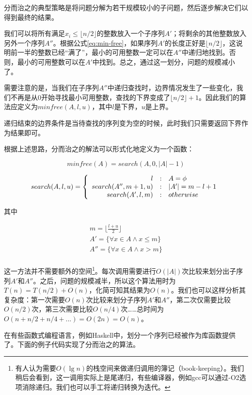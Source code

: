 \documentclass[UTF8]{article}
\begin{document}
分而治之的典型策略是将问题分解为若干规模较小的子问题，然后逐步解决它们以得到最终的结果。

我们可以将所有满足$x_i \leq \lfloor n/2 \rfloor$的整数放入一个子序列$A'$；将剩余的其他整数放入另外一个序列$A''$。根据公式\ref{eq:min-free}，如果序列$A'$的长度正好是$\lfloor n/2 \rfloor$，这说明前一半的整数已经“满了”，最小的可用整数一定可以在$A''$中递归地找到。否则，最小的可用整数可以在$A'$中找到。总之，通过这一划分，问题的规模减小了。

需要注意的是，当我们在子序列$A''$中递归查找时，边界情况发生了一些变化，我们不再是从0开始寻找最小可用整数，查找的下界变成了$\lfloor n/2 \rfloor + 1$。因此我们的算法应定义为$minfree(A, l, u)$，其中$l$是下界，$u$是上界。

递归结束的边界条件是当待查找的序列变为空的时候，此时我们只需要返回下界作为结果即可。

根据上述思路，分而治之的解法可以形式化地定义为一个函数：

\[
minfree(A) = search(A, 0, |A|-1)
\]

\[
search(A, l, u) = \left \{
       \begin{array}
       {r@{\quad:\quad}l}
       l & A = \phi \\
       search(A'', m+1, u) &  |A'| = m - l + 1 \\
       search(A',  l, m) & otherwise
       \end{array}
\right.
\]

其中

\[ \begin{array}{l}
m = \displaystyle \lfloor \frac{l+u}{2} \rfloor \\
A'  = \{ \forall x \in A \wedge x \leq m \} \\
A'' = \{ \forall x \in A \wedge x > m \} \\
\end{array} \]

这一方法并不需要额外的空间\footnote{有人认为需要$O(\lg n)$的栈空间来做递归调用的簿记（book-keeping）。我们稍后会看到，这一调用实际上是尾递归，有些编译器，例如gcc可以通过-O2选项消除递归。我们也可以手工将递归转换为迭代。}。每次调用需要进行$O(|A|)$次比较来划分出子序列$A'$和$A''$。之后，问题的规模减半，所以这个算法用时为$T(n) = T(n/2) + O(n)$，化简可知其结果为$O(n)$。我们也可以这样分析其复杂度：第一次需要$O(n)$次比较来划分子序列$A'$和$A''$，第二次仅需要比较$O(n/2)$次，第三次需要比较$O(n/4)$次……总时间为$O(n + n/2 + n/4 + ...) = O(2n) = O(n)$。

在有些函数式编程语言，例如Haskell中，划分一个序列已经被作为库函数提供了。下面的例子代码实现了分而治之的算法。
\end{document}
